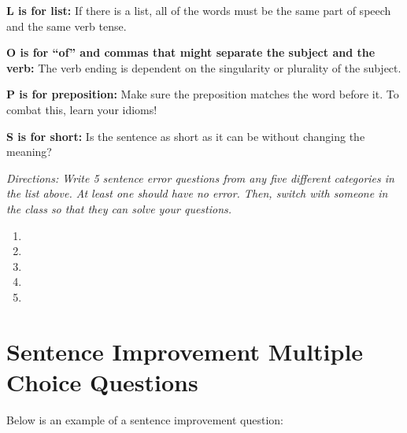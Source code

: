 \documentclass[12pt]{book}
\begin{document}
\bigskip
\textbf{L is for list:} If there is a list, all of the words must be the same part of speech and the same verb tense. 

\bigskip
\textbf{O is for “of” and commas that might separate the subject and the verb:} The verb ending is dependent on the singularity or plurality of the subject.

\bigskip
\textbf{P is for preposition:} Make sure the preposition matches the word before it. To combat this, learn your idioms!

\bigskip
\textbf{S is for short:} Is the sentence as short as it can be without changing the meaning? 

\vfill
\textit{Directions: Write 5 sentence error questions from any five different categories in the list above. At least one should have no error. Then, switch with someone in the class so that they can solve your questions.}

\begin{enumerate}
\item 
\vfill
\item 
\vfill
\item
\vfill
\item
\vfill
\item
\vfill
\end{enumerate}

\newpage


\section[Sentence Improvement]{Sentence Improvement Multiple Choice Questions}
Below is an example of a sentence improvement question:
\end{document}
